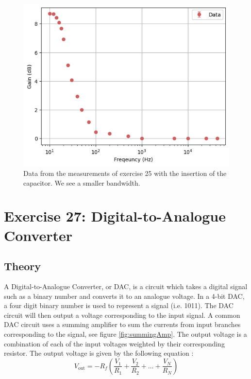 \documentclass[%
reprint,
amsmath,amssymb,
aps,
floatfix
]{revtex4-2}
\begin{document}
		\begin{figure}
			\includegraphics[width=0.85\columnwidth]{ex25ResultsWithCapacitor.png}
			\caption{\label{fig:ex25ResultsWithCapacitor}Data from the measurements of exercise 25 with the insertion of the capacitor. We see a smaller bandwidth.}
		\end{figure}
		
	\section{Exercise 27: Digital-to-Analogue Converter}
		\subsection{Theory}
		A Digital-to-Analogue Converter, or DAC, is a circuit which takes a digital signal such as a binary number and converts it to an analogue voltage. In a 4-bit DAC, a four digit binary number is used to represent a signal (i.e. 1011). The DAC circuit will then output a voltage corresponding to the input signal. A common DAC circuit uses a summing amplifier to sum the currents from input branches corresponding to the signal, see figure \ref{fig:summingAmp}. The output voltage is a combination of each of the input voltages weighted by their corresponding resistor. The output voltage is given by the following equation \cite{manual}:
		\begin{equation}
			V_\text{out} = -R_f \left(\frac{V_1}{R_1} + \frac{V_2}{R_2} + \dots + \frac{V_N}{R_N}\right)
			\label{eq:DAC}
		\end{equation}
		
\end{document}
